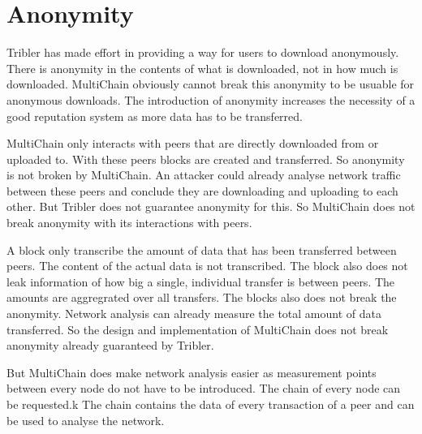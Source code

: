\section{Anonymity}
Tribler has made effort in providing a way for users to download anonymously\cite{Plak-anonymous}\cite{ruigrok-anonymous}.
There is anonymity in the contents of what is downloaded, not in how much is downloaded.
MultiChain obviously cannot break this anonymity to be usuable for anonymous downloads.
The introduction of anonymity increases the necessity of a good reputation system as more data has to be transferred.

MultiChain only interacts with peers that are directly downloaded from or uploaded to.
With these peers blocks are created and transferred.
So anonymity is not broken by MultiChain.
An attacker could already analyse network traffic between these peers
and conclude they are downloading and uploading to each other.
But Tribler does not guarantee anonymity for this.
So MultiChain does not break anonymity with its interactions with peers.

A block only transcribe the amount of data that has been transferred between peers.
The content of the actual data is not transcribed.
The block also does not leak information of how big a single, individual transfer is between peers.
The amounts are aggregrated over all transfers.
The blocks also does not break the anonymity.
Network analysis can already measure the total amount of data transferred.
So the design and implementation of MultiChain does not break anonymity already guaranteed by Tribler.

But MultiChain does make network analysis easier as measurement points between every node do not have to be introduced.
The chain of every node can be requested.k
The chain contains the data of every transaction of a peer and can be used to analyse the network.